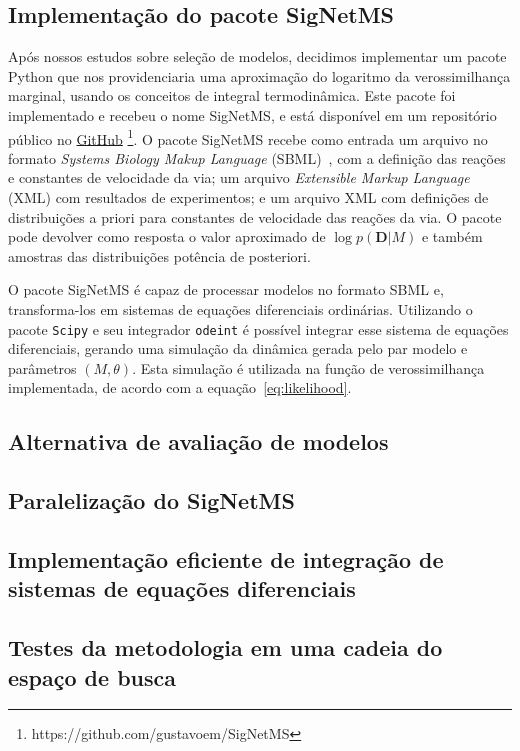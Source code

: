 \documentclass[12pt]{article}
\newcommand{\algname}[1]{\texttt{#1}}
\begin{document}
\subsection{Implementação do pacote SigNetMS}
Após nossos estudos sobre seleção de modelos, decidimos implementar
um pacote Python que nos providenciaria uma aproximação do logaritmo da
verossimilhança marginal, usando os conceitos de integral termodinâmica.
Este pacote foi implementado e recebeu o nome SigNetMS, e está 
disponível em um repositório público no
\href{https://github.com/gustavoem/SigNetMS}{GitHub}
\footnote{https://github.com/gustavoem/SigNetMS}. O pacote SigNetMS 
recebe como entrada um arquivo no formato \emph{Systems Biology Makup
Language} (SBML)~\cite{Hucka2003}, com a definição das reações e 
constantes de velocidade da via; um arquivo \emph{Extensible Markup 
Language} (XML) com resultados de experimentos; e um arquivo XML com 
definições de distribuições a priori para constantes de velocidade das
reações da via. O pacote pode devolver como resposta o valor aproximado
de $\log p (\mathbf{D} | M)$ e também amostras das distribuições
potência de posteriori.

O pacote SigNetMS é capaz de processar modelos no formato SBML e,
transforma-los em sistemas de equações diferenciais ordinárias.
Utilizando o pacote \algname{Scipy} e seu integrador \algname{odeint} é
possível integrar esse sistema de equações diferenciais, gerando uma
simulação da dinâmica gerada pelo par modelo e parâmetros $(M, \theta)$.
Esta simulação é utilizada na função de verossimilhança implementada,
de acordo com a equação~\ref{eq:likelihood}.

\subsection{Alternativa de avaliação de modelos}

\subsection{Paralelização do SigNetMS}

\subsection{Implementação eficiente de integração de sistemas de
equações diferenciais}

\subsection{Testes da metodologia em uma cadeia do espaço de busca}





 

\end{document}
